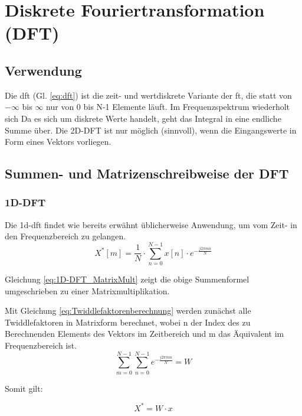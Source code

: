 \section{Diskrete Fouriertransformation (DFT)}




\subsection{Verwendung}

Die \gls{dft} (Gl. \ref{eq:dft}) ist die zeit- und wertdiskrete Variante der \gls{ft}, die statt von $-\infty$ bis $\infty$ nur von 0 bis N-1 Elemente läuft. 
Im Frequenzspektrum wiederholt sich 
Da es sich um diskrete Werte handelt, geht das Integral in eine endliche Summe über. Die 2D-DFT ist nur möglich (sinnvoll), wenn die Eingangswerte in Form eines Vektors vorliegen.


\subsection{Summen- und Matrizenschreibweise der DFT}
\subsubsection{1D-DFT}
Die \gls{1d-dft} findet wie bereits erwähnt üblicherweise Anwendung, um vom Zeit- in den Frequenzbereich zu gelangen.
\begin{equation}\label{eq:dft}
 X^* \left[ m \right] = \frac{1}{N} \cdot \sum^{N-1}_{n=0} x[n] \cdot e^{-\frac{j 2 \pi m n}{N}}
\end{equation}



Gleichung \ref{eq:1D-DFT_MatrixMult} zeigt die obige Summenformel umgeschrieben zu einer Matrixmultiplikation.

Mit Gleichung \ref{eq:Twiddlefaktorenberechnung} werden zunächst alle Twiddlefaktoren in Matrixform berechnet, wobei n der Index des zu Berechnenden Elements des Vektors im Zeitbereich und
m das Äquivalent im Frequenzbereich ist.
\begin{equation}\label{eq:Twiddlefaktorenberechnung}
\sum^{N-1 }_{m=0} \sum^{N-1 }_{n=0} e^{-\frac{j 2 \pi m n}{N}} = W
\end{equation}


Somit gilt:

\begin{equation}\label{eq:1D-DFT_MatrixMult}
X^* = W \cdot x
\end{equation}


